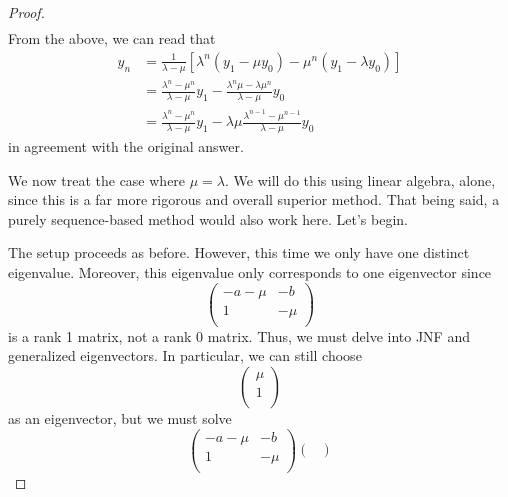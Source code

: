 \documentclass[../psets.tex]{subfiles}
\begin{document}
\begin{enumerate}
\begin{enumerate}
\begin{proof}
\begin{align*}
            \end{align*}
            From the above, we can read that
            \begin{align*}
                y_n &= \frac{1}{\lambda-\mu}[\lambda^n(y_1-\mu y_0)-\mu^n(y_1-\lambda y_0)]\\
                &= \frac{\lambda^n-\mu^n}{\lambda-\mu}y_1-\frac{\lambda^n\mu-\lambda\mu^n}{\lambda-\mu}y_0\\
                &= \frac{\lambda^n-\mu^n}{\lambda-\mu}y_1-\lambda\mu\frac{\lambda^{n-1}-\mu^{n-1}}{\lambda-\mu}y_0
            \end{align*}
            in agreement with the original answer.\par\smallskip
            We now treat the case where $\mu=\lambda$. We will do this using linear algebra, alone, since this is a far more rigorous and overall superior method. That being said, a purely sequence-based method would also work here. Let's begin.\par
            The setup proceeds as before. However, this time we only have one distinct eigenvalue. Moreover, this eigenvalue only corresponds to one eigenvector since
            \begin{equation*}
                \begin{pmatrix}
                    -a-\mu & -b\\
                    1 & -\mu\\
                \end{pmatrix}
            \end{equation*}
            is a rank 1 matrix, not a rank 0 matrix. Thus, we must delve into JNF and generalized eigenvectors. In particular, we can still choose
            \begin{equation*}
                \begin{pmatrix}
                    \mu\\
                    1\\
                \end{pmatrix}
            \end{equation*}
            as an eigenvector, but we must solve
            \begin{equation*}
                \begin{pmatrix}
                    -a-\mu & -b\\
                    1 & -\mu\\
                \end{pmatrix}
                \begin{pmatrix}

\end{pmatrix}
\end{equation*}
\end{proof}
\end{enumerate}
\end{enumerate}
\end{document}
